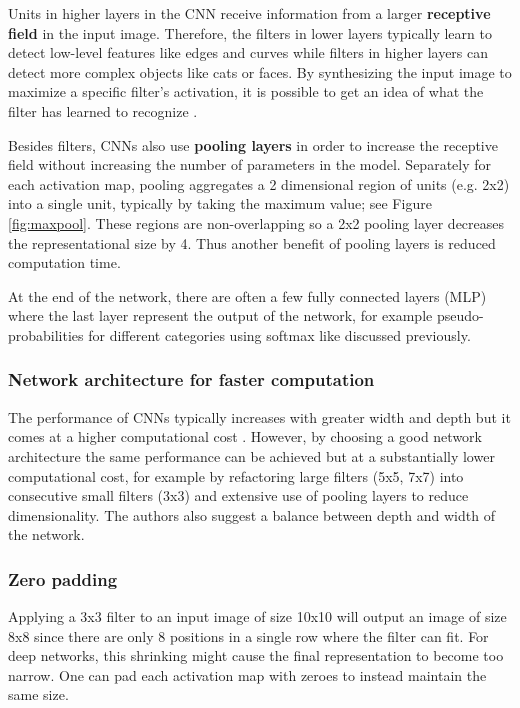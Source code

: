 Units in higher layers in the CNN receive information from a larger \textbf{receptive field} in the input image. Therefore, the filters in lower layers typically learn to detect low-level features like edges and curves while filters in higher layers can detect more complex objects like cats or faces.
By synthesizing the input image to maximize a specific filter's activation, it is possible to get an idea of what the filter has learned to recognize \cite{VisualizeCnn}.




Besides filters, CNNs also use \textbf{pooling layers} in order to increase the receptive field without increasing the number of parameters in the model.
Separately for each activation map, pooling aggregates a 2 dimensional region of units (e.g. 2x2) into a single unit, typically by taking the maximum value; see Figure \ref{fig:maxpool}. These regions are non-overlapping so a 2x2 pooling layer decreases the representational size by 4. Thus another benefit of pooling layers is reduced computation time.

At the end of the network, there are often a few fully connected layers (MLP) where the last layer represent the output of the network, for example pseudo-probabilities for different categories using softmax like discussed previously.

\subsubsection{Network architecture for faster computation}

The performance of CNNs typically increases with greater width and depth but it comes at a higher computational cost \cite{InceptionV3}. However, by choosing a good network architecture the same performance can be achieved but at a substantially lower computational cost, for example by refactoring large filters (5x5, 7x7) into consecutive small filters (3x3) and extensive use of pooling layers to reduce dimensionality. The authors also suggest a balance between depth and width of the network.

\subsubsection{Zero padding}

Applying a 3x3 filter to an input image of size 10x10 will output an image of size 8x8 since there are only 8 positions in a single row where the filter can fit. For deep networks, this shrinking might cause the final representation to become too narrow.
One can pad each activation map with zeroes to instead maintain the same size.

